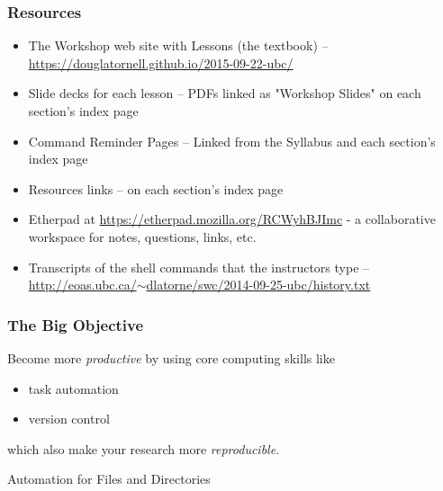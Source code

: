 \documentclass{beamer}
\begin{document}
\begin{frame}
  \frametitle{Resources}
  \begin{itemize}
    \item The Workshop web site with Lessons (the textbook) -- \href{https://douglatornell.github.io/2015-09-22-ubc/}{https://douglatornell.github.io/2015-09-22-ubc/}
    \item Slide decks for each lesson -- PDFs linked as "Workshop Slides" on each section's index page
    \item Command Reminder Pages -- Linked from the Syllabus and each section's index page
    \item Resources links -- on each section's index page
    \item Etherpad at \href{https://etherpad.mozilla.org/RCWyhBJImc}{https://etherpad.mozilla.org/RCWyhBJImc} - a collaborative workspace for notes, questions, links, etc.
    \item Transcripts of the shell commands that the instructors type -- \href{http://eoas.ubc.ca/~dlatorne/swc/2014-09-25-ubc/history.txt}{http://eoas.ubc.ca/$\sim$dlatorne/swc/2014-09-25-ubc/history.txt}
  \end{itemize}
\end{frame}


\begin{frame}
  \frametitle{The Big Objective}
  Become more {\em productive} by using core computing skills like
  \begin{itemize}
    \item task automation
    \item version control
  \end{itemize}
  which also make your research more {\em reproducible}.
\end{frame}


\begin{frame}
  \begin{block}{Automation for Files and Directories}
  \end{block}
\end{frame}
\end{document}
